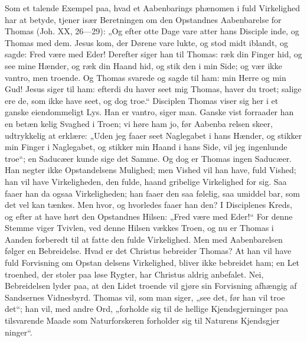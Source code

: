 \documentclass[12pt]{book}
\newcommand{\opage}[1]{\marginnote{\footnotesize\textit{[#1]}}}
\begin{document}
Som et talende Exempel paa, hvad et Aabenbarings\-%
phænomen i fuld Virkelighed har at betyde, tjener især
Beretningen om den Opstandnes Aabenbarelse for Thomas
(Joh. XX, 26---29): „Og efter otte Dage vare atter hans
Disciple inde, og Thomas med dem. Jesus kom, der
Dørene vare lukte, og stod midt iblandt, og sagde: Fred
være med Eder! Derefter siger han til Thomas: ræk
din Finger hid, og see mine Hænder, og ræk din Haand
hid, og stik den i min Side; og vær ikke vantro, men
troende. Og Thomas svarede og sagde til ham: min
Herre og min Gud! Jesus siger til ham: efterdi du
\opage{174}\setcounter{footnote}{0}%
haver seet mig Thomas, haver du troet; salige ere de,
som ikke have seet, og dog troe.“ Disciplen Thomas
viser sig her i et ganske eiendommeligt Lys. Han er
vantro, siger man. Ganske vist forraader han en betæn\-%
kelig Svaghed i Troen; vi høre ham jo, før Aabenba\-%
relsen skeer, udtrykkelig at erklære: „Uden jeg faaer seet
Naglegabet i hans Hænder, og stikker min Finger i
Naglegabet, og stikker min Haand i hans Side, vil jeg
ingenlunde troe“; en Saducæer kunde sige det Samme.
Og dog er Thomas ingen Saducæer. Han negter ikke
Opstandelsens Mulighed; men Vished vil han have, fuld
Vished; han vil have Virkeligheden, den fulde, haand\-%
gribelige Virkelighed for sig. Saa faaer han da ogsaa
Virkeligheden; han faaer den saa følelig, saa umiddel\-%
bar, som det vel kan tænkes. Men hvor, og hvorledes
faaer han den? I Disciplenes Kreds, og efter at have
hørt den Opstandnes Hilsen: „Fred være med Eder!“
For denne Stemme viger Tvivlen, ved denne Hilsen
vækkes Troen, og nu er Thomas i Aanden forberedt til
at fatte den fulde Virkelighed. Men med Aabenbarelsen
følger en Bebreidelse. Hvad er det Christus bebreider
Thomas? At han vil have fuld Forvisning om Opstan\-%
delsens Virkelighed, bliver ikke bebreidet ham; en Let\-%
troenhed, der stoler paa løse Rygter, har Christus aldrig
anbefalet. Nei, Bebreidelsen lyder paa, at den Lidet\-%
troende vil gjøre sin Forvisning afhængig af Sandsernes
Vidnesbyrd. Thomas vil, som man siger, „see det, før han
vil troe det“; han vil, med andre Ord, „forholde sig til
de hellige Kjendsgjerninger paa tilsvarende Maade som
Naturforskeren forholder sig til Naturens Kjendsgjer\-%
ninger“.
\end{document}
